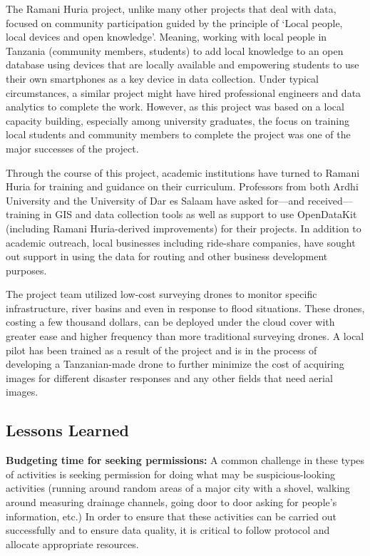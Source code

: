 \documentclass[a4paper,12pt,twoside]{article}
\begin{document}
The Ramani Huria project, unlike many other projects that deal with data, focused on community participation guided by the principle of ‘Local people, local devices and open knowledge'. Meaning,  working with local people in Tanzania (community members, students) to add local knowledge to an open database using devices that are locally available and empowering students to use  their own smartphones as a key device in data collection. Under typical circumstances, a similar project might have hired professional engineers and data analytics to complete the work. However, as this project was based on a local capacity building, especially among university graduates, the focus on training local students and community members to complete the project was one of the major successes of the project.

Through the course of this project, academic institutions have turned to Ramani Huria for training and guidance on their curriculum. Professors from both Ardhi University and the University of Dar es Salaam have asked for—and received—training in GIS and data collection tools as well as support to use OpenDataKit (including Ramani Huria-derived improvements) for their projects. In addition to academic outreach, local businesses including ride-share companies, have sought out support in using the data for routing and other business development purposes. 

The project team utilized low-cost surveying drones to monitor specific infrastructure, river basins and even in response to flood situations. These drones, costing a few thousand dollars, can be deployed under the cloud cover with greater ease and higher frequency than more traditional surveying drones.   A local pilot has been trained as a result of the project and is in the process of developing a Tanzanian-made drone to further minimize the cost of acquiring images for different disaster responses and any other fields that need aerial images.

\subsection{Lessons Learned}

\textbf{Budgeting time for seeking permissions:} A common challenge in these types of activities is seeking permission for doing what may be suspicious-looking activities (running around random areas of a major city with a shovel, walking around measuring drainage channels, going door to door asking for people’s information, etc.) In order to ensure that these activities can be carried out successfully and to ensure data quality, it is critical to follow protocol and allocate appropriate resources.
\end{document}
